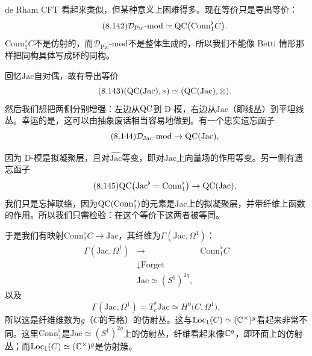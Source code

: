de Rham CFT 看起来类似，但某种意义上困难得多。现在等价只是导出等价：
\begin{equation}\tag{8.142}
\mathcal D_{\mathrm{Pic}}\text{-mod}\simeq\mathrm{QC}\bigl(\mathrm{Conn}^{\flat}_1 C\bigr).
\end{equation}
$\mathrm{Conn}^{\flat}_1 C$不是仿射的，而$\mathcal D_{\mathrm{Pic}}$-mod不是整体生成的，所以我们不能像 Betti 情形那样把同构具体写成环的同构。

回忆$\mathrm{Jac}$自对偶，故有导出等价
\begin{equation}\tag{8.143}
(\mathrm{QC}(\mathrm{Jac}),*)\simeq(\mathrm{QC}(\mathrm{Jac}),\otimes).
\end{equation}
然后我们想把两侧分别增强：左边从$\mathrm{QC}$到 D-模，右边从$\mathrm{Jac}$（即线丛）到平坦线丛。幸运的是，这可以由抽象废话相当容易地做到。有一个忠实遗忘函子
\begin{equation}\tag{8.144}
\mathcal D_{\mathrm{Jac}}\text{-mod}\to\mathrm{QC}(\mathrm{Jac}),
\end{equation}

因为 D-模是拟凝聚层，且对$\widehat{\mathrm{Jac}}$等变，即对$\mathrm{Jac}$上向量场的作用等变。另一侧有遗忘函子
\begin{equation}\tag{8.145}
\mathrm{QC}\bigl(\mathrm{Jac}^{\flat}=\mathrm{Conn}^{\flat}_1\bigr)\to\mathrm{QC}(\mathrm{Jac}),
\end{equation}
我们只是忘掉联络，因为$\mathrm{QC}(\mathrm{Conn}^{\flat}_1)$的元素是$\mathrm{Jac}$上的拟凝聚层，并带纤维上函数的作用。所以我们只需检验：在这个等价下这两者被等同。

于是我们有映射$\mathrm{Conn}^{\flat}_1 C\to\mathrm{Jac}$，其纤维为$\Gamma(\mathrm{Jac},\Omega^{1})$：
\begin{equation}\tag{8.146}
\begin{array}{ccc}
\Gamma(\mathrm{Jac},\Omega^{1}) & \longrightarrow & \mathrm{Conn}^{\flat}_1 C\\[2pt]
& \downarrow{\scriptstyle\text{Forget}} &\\[2pt]
& \mathrm{Jac}\simeq(S^{1})^{2g}, &
\end{array}
\end{equation}
以及
\begin{equation}\tag{8.147}
\Gamma(\mathrm{Jac},\Omega^{1})=T^{*}_e\mathrm{Jac}\simeq H^{0}\bigl(C,\Omega^{1}\bigr),
\end{equation}
所以这是纤维维数为$g$（$C$的亏格）的仿射丛。这与$\mathrm{Loc}_1(C)\simeq(\mathbb{C}^{\times})^{g}$看起来非常不同。这里$\mathrm{Conn}^{\flat}_1$是$\mathrm{Jac}\simeq(S^{1})^{2g}$上的仿射丛，纤维看起来像$\mathbb{C}^{g}$，即环面上的仿射丛；而$\mathrm{Loc}_1(C)\simeq(\mathbb{C}^{\times})^{g}$是仿射簇。

